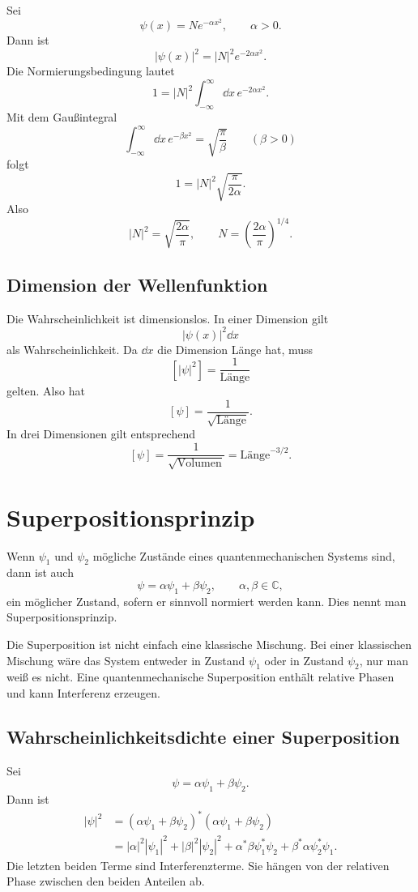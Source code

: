 \begin{calculationbox}
Sei
\[
    \psi(x)=N e^{-\alpha x^2},
    \qquad \alpha>0.
\]
Dann ist
\[
    |\psi(x)|^2=|N|^2 e^{-2\alpha x^2}.
\]
Die Normierungsbedingung lautet
\[
    1=|N|^2\int_{-\infty}^{\infty}\dd x\,e^{-2\alpha x^2}.
\]
Mit dem Gaußintegral
\[
    \int_{-\infty}^{\infty}\dd x\,e^{-\beta x^2}
    =\sqrt{\frac{\pi}{\beta}}
    \qquad (\beta>0)
\]
folgt
\[
    1=|N|^2\sqrt{\frac{\pi}{2\alpha}}.
\]
Also
\[
    |N|^2=\sqrt{\frac{2\alpha}{\pi}},
    \qquad
    N=\left(\frac{2\alpha}{\pi}\right)^{1/4}.
\]
\end{calculationbox}

\subsection{Dimension der Wellenfunktion}

Die Wahrscheinlichkeit ist dimensionslos. In einer Dimension gilt
\[
    |\psi(x)|^2\dd x
\]
als Wahrscheinlichkeit. Da $\dd x$ die Dimension Länge hat, muss
\[
    [|\psi|^2]=\frac{1}{\text{Länge}}
\]
gelten. Also hat
\[
    [\psi]=\frac{1}{\sqrt{\text{Länge}}}.
\]
In drei Dimensionen gilt entsprechend
\[
    [\psi]=\frac{1}{\sqrt{\text{Volumen}}}=\text{Länge}^{-3/2}.
\]

\section{Superpositionsprinzip}

\begin{definitionbox}
Wenn $\psi_1$ und $\psi_2$ mögliche Zustände eines quantenmechanischen Systems sind, dann ist auch
\[
    \psi=\alpha\psi_1+\beta\psi_2,
    \qquad \alpha,\beta\in\mathbb{C},
\]
ein möglicher Zustand, sofern er sinnvoll normiert werden kann. Dies nennt man Superpositionsprinzip.
\end{definitionbox}

Die Superposition ist nicht einfach eine klassische Mischung. Bei einer klassischen Mischung wäre das System entweder in Zustand $\psi_1$ oder in Zustand $\psi_2$, nur man weiß es nicht. Eine quantenmechanische Superposition enthält relative Phasen und kann Interferenz erzeugen.

\subsection{Wahrscheinlichkeitsdichte einer Superposition}

Sei
\[
    \psi=\alpha\psi_1+\beta\psi_2.
\]
Dann ist
\begin{align*}
    |\psi|^2
    &= (\alpha\psi_1+\beta\psi_2)^*(\alpha\psi_1+\beta\psi_2)\\
    &= |\alpha|^2|\psi_1|^2+|\beta|^2|\psi_2|^2
    +\alpha^*\beta\psi_1^*\psi_2+\beta^*\alpha\psi_2^*\psi_1.
\end{align*}
Die letzten beiden Terme sind Interferenzterme. Sie hängen von der relativen Phase zwischen den beiden Anteilen ab.

